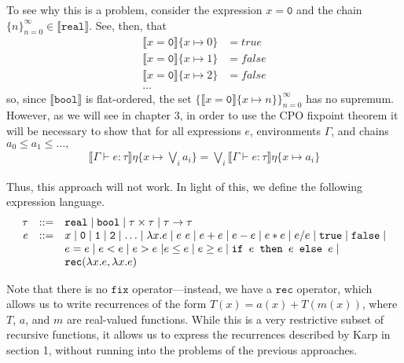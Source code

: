 To see why this is a problem, consider the expression $x = \texttt{0}$ and the chain $\{n\}_{n=0}^{\infty} \in \llbracket 
\texttt{real} \rrbracket$. See, then, that
\begin{align*}
\llbracket x = \texttt{0} \rrbracket\{x \mapsto 0\} &= true \\
\llbracket x = \texttt{0} \rrbracket\{x \mapsto 1\} &= false \\
\llbracket x = \texttt{0} \rrbracket\{x \mapsto 2\} &= false \\
\ldots
\end{align*}
so, since $\llbracket \texttt{bool} \rrbracket$ is flat-ordered, the set 
$\{\llbracket x = \texttt{0}\rrbracket\{x \mapsto n\}\}_{n=0}^{\infty}$ has no supremum. However, as we will see in chapter 3,
in order to use the CPO fixpoint theorem it will be necessary to show that for all expressions $e$, environments $\Gamma$,
and chains $a_0 \leq a_1 \leq \ldots,$
\begin{align*}
  \llbracket \Gamma \vdash e : \tau \rrbracket\eta\{x\mapsto \bigvee_i a_i\}
  = \bigvee_i \llbracket \Gamma \vdash e : \tau \rrbracket\eta\{x \mapsto a_i\}
\end{align*}

Thus, this approach will not work. In light of this, we define the following expression language. 
\[
\begin{array}{rcl}
\tau &::=& \texttt{real} \mid \texttt{bool} \mid \tau \times \tau \mid \tau \rightarrow \tau \\
e &::=& x  \mid \texttt{0} \mid \texttt{1} \mid \texttt{2} \mid \dotsc \mid \lambda x.e \mid e \ e \mid e + e \mid e - e \mid  e  *  e \mid e / e \mid \texttt{true} \mid \texttt{false} \mid \\
  && e  =  e \mid e < e \mid e > e \ | e \leq e \mid e \geq e \mid 
     \texttt{if } e \texttt{ then } e \texttt{ else } e \mid \\
    && \texttt{rec}(\lambda x.e, \lambda x.e) 
\end{array}
\]

Note that there is no $\texttt{fix}$ operator---instead, we have a $\texttt{rec}$ operator, which allows us to write 
recurrences of the form $T(x) = a(x) + T(m(x))$, where $T$, $a$, and $m$ are real-valued functions. While this is a very 
restrictive subset of recursive functions, it allows us to express the recurrences described by Karp in section 1, without
running into the problems of the previous approaches. 

